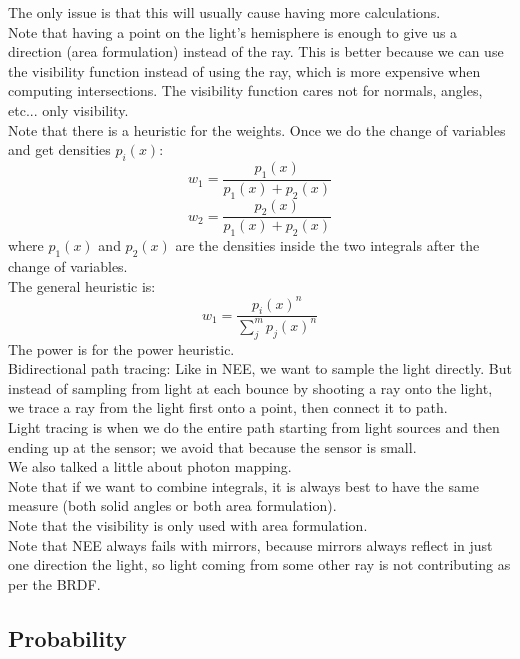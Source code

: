 \documentclass[12pt]{article}
\begin{document}
The only issue is that this will usually
cause having more calculations. \\

Note that having a point on the light's hemisphere
is enough to give us a direction (area formulation)
instead of the ray. This is better because we can
use the visibility function instead of using
the ray, which is more expensive when computing
intersections. The visibility function cares
not for normals, angles, etc... only visibility. \\

Note that there is a heuristic for the weights.
Once we do the change of variables and
get densities $p_i(x)$:
\[ w_1 = \dfrac{p_1(x)}{p_1(x) + p_2(x)} \]
\[ w_2 = \dfrac{p_2(x)}{p_1(x) + p_2(x)} \]
where $p_1(x)$ and $p_2(x)$ are the densities
inside the two integrals after the change
of variables. \\
The general heuristic is:
\[ w_1 = \dfrac{p_i(x)^n}{\sum_j^m p_j(x)^n} \]
The power is for the power heuristic. \\

Bidirectional path tracing:
Like in NEE, we want to sample the light directly.
But instead of sampling from light at each bounce
by shooting a ray onto the light, 
we trace a ray from the light first
onto a point, then connect it to path. \\

Light tracing is when we do the entire path
starting from light sources and then ending
up at the sensor; we avoid that because the
sensor is small. \\

We also talked a little about photon mapping. \\

Note that if we want to combine integrals,
it is always best to have the same measure
(both solid angles or both area formulation). \\
Note that the visibility is only used with
area formulation. \\

Note that NEE always fails with mirrors, 
because mirrors always reflect in just one
direction the light, so light coming from some
other ray is not contributing as per the BRDF. \\

\newpage

\subsection*{Probability}
\end{document}
